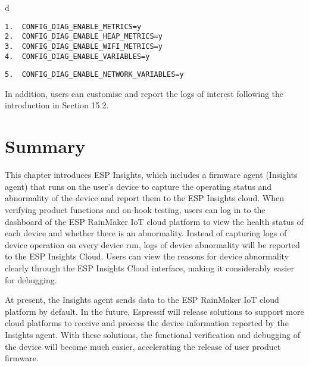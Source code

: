 \documentclass[a4paper,12pt]{book}
\begin{document}
\begin{codebloc}
\begin{tabular}{d}
\vspace{2pt}
\begin{verbatim}
1.  CONFIG_DIAG_ENABLE_METRICS=y
2.  CONFIG_DIAG_ENABLE_HEAP_METRICS=y
3.  CONFIG_DIAG_ENABLE_WIFI_METRICS=y
4.  CONFIG_DIAG_ENABLE_VARIABLES=y
\end{verbatim}
\verb|5.  CONFIG_DIAG_ENABLE_NETWORK_VARIABLES=y|
\end{tabular}
\end{codebloc}

In addition, users can customise and report the logs of interest following the introduction in Section 15.2.

\section{Summary}
This chapter introduces ESP Insights, which includes a firmware agent (Insights agent) that runs on the user's device to capture the operating status and abnormality of the device and report them to the ESP Insights cloud. When verifying product functions and on-hook testing, users can log in to the dashboard of the ESP RainMaker IoT cloud platform to view the health status of each device and whether there is an abnormality. Instead of capturing logs of device operation on every device run, logs of device abnormality will be reported to the ESP Insights Cloud. Users can view the reasons for device abnormality clearly through the ESP Insights Cloud interface, making it considerably easier for debugging.

At present, the Insights agent sends data to the ESP RainMaker IoT cloud platform by default. In the future, Espressif will release solutions to support more cloud platforms to receive and process the device information reported by the Insights agent. With these solutions, the functional verification and debugging of the device will become much easier, accelerating the release of user product firmware.
\end{document}

